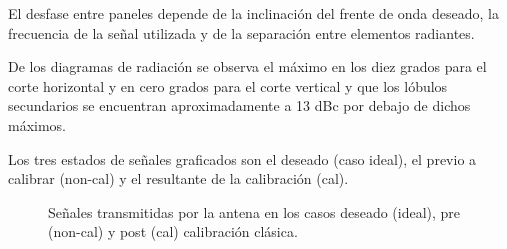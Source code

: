 El desfase entre paneles depende de la inclinación del frente de onda deseado, la frecuencia de la señal utilizada y de la
separación entre elementos radiantes.

De los diagramas de radiación se observa el máximo en los diez grados para el corte horizontal y en cero grados para el corte
vertical y que los lóbulos secundarios se encuentran aproximadamente a 13 dBc por debajo de dichos máximos.

Los tres estados de señales graficados son el deseado (caso ideal), el previo a calibrar (non-cal) y el resultante de la
calibración (cal).

\begin{figure}[H]
	\centering

	\caption{Señales transmitidas por la antena en los casos deseado (ideal), pre (non-cal) y post (cal) calibración clásica.}
	\label{fig:nonErrClassical10degCol}
\end{figure}

